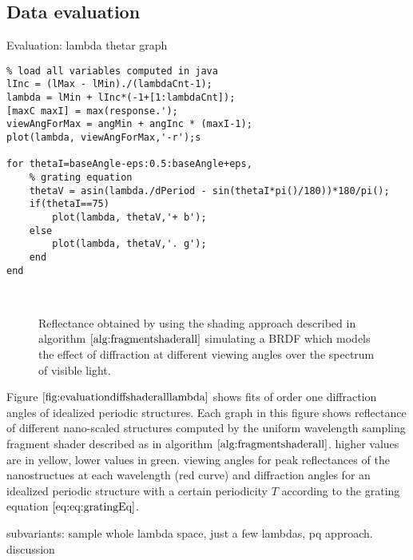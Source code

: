 \subsection{Data evaluation}

\begin{algorithm}[H]
\caption{Evaluation: lambda thetar graph}
\label{alg:evalmatlab}
\begin{lstlisting}
% load all variables computed in java
lInc = (lMax - lMin)./(lambdaCnt-1);
lambda = lMin + lInc*(-1+[1:lambdaCnt]);
[maxC maxI] = max(response.');
viewAngForMax = angMin + angInc * (maxI-1);
plot(lambda, viewAngForMax,'-r');s

for thetaI=baseAngle-eps:0.5:baseAngle+eps,
	% grating equation
	thetaV = asin(lambda./dPeriod - sin(thetaI*pi()/180))*180/pi();
	if(thetaI==75)
		plot(lambda, thetaV,'+ b');
	else
		plot(lambda, thetaV,'. g');
	end
end

\end{lstlisting}
\end{algorithm}

\begin{figure}[H]
  \centering
~
~

  \caption{Reflectance obtained by using the shading approach described in algorithm $\ref{alg:fragmentshaderall}$ simulating a BRDF which models the effect of diffraction at different viewing angles over the spectrum of visible light.}
  \label{fig:evaluationdiffshaderalllambda}
\end{figure}

Figure $\ref{fig:evaluationdiffshaderalllambda}$ shows fits of order one diffraction angles of idealized periodic structures. Each graph in this figure shows reflectance of different nano-scaled structures computed by the uniform wavelength sampling fragment shader described as in algorithm $\ref{alg:fragmentshaderall}$. higher values are in yellow, lower values in green. viewing angles for peak reflectances of the nanostructues at each wavelength (red curve) and diffraction angles for an idealized periodic structure with a certain periodicity $T$ according to the grating equation $\ref{eq:eq:gratingEq}$.


subvariants: sample whole lambda space, just a few lambdas, pq approach.
discussion
